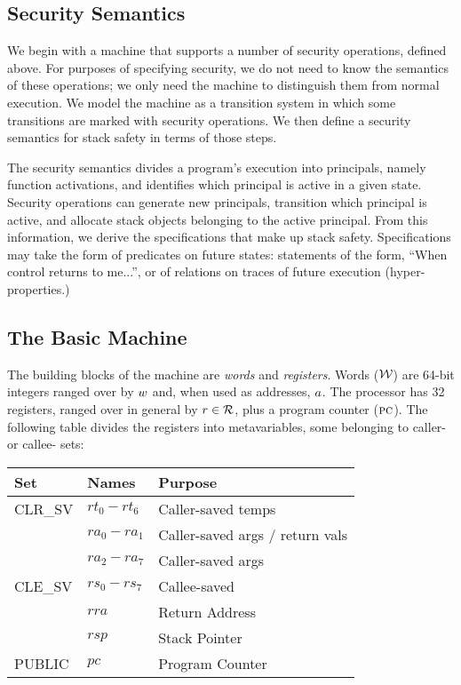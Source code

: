 \documentclass[10pt,conference]{ieeetran}%
\theoremstyle{definition}
\begin{document}
\subsection{Security Semantics}

We begin with a machine that supports a number of security operations,
defined above. For purposes of specifying security, we do not need to
know the semantics of these operations; we only need the machine to
distinguish them from normal execution. We model the machine as
a transition system in which some transitions are marked with
security operations. We then define a security semantics for stack safety
in terms of those steps.

The security semantics divides a program's execution into principals,
namely function activations, and identifies which principal is active
in a given state. Security operations can generate new principals, transition
which principal is active, and allocate stack objects belonging to the active
principal. From this information, we derive the specifications that make up
stack safety. Specifications may take the form of predicates on
future states: statements of the form, ``When control returns to me...'',
or of relations on traces of future execution (hyper-properties.)

\subsection{The Basic Machine}

The building blocks of the machine are {\em words} and {\em registers}.
Words (\({\mathcal W}\)) are 64-bit integers ranged over by \(w\) and, when used as addresses,
\(a\). The processor has 32 registers, ranged over in general by \(r \in {\mathcal R}\),
plus a program counter (\(\textsc{pc}\)). The following table divides
the registers into metavariables, some belonging to caller- or callee- sets:

\vspace{\abovedisplayskip}
\begin{tabular}{| l | l | l |}
  \hline
  Set & Names & Purpose \\
  \hline
  CLR\_SV & \(rt_0 - rt_6\) & Caller-saved temps \\
  & \(ra_0 - ra_1\) & Caller-saved args / return vals \\
  & \(ra_2 - ra_7\) & Caller-saved args \\
  \hline
  CLE\_SV & \(rs_0 - rs_7\) & Callee-saved \\
  & \(rra\) & Return Address \\
  & \(rsp\) & Stack Pointer \\  
  \hline
  PUBLIC & \(pc\) & Program Counter \\
  \hline
\end{tabular}
\vspace{\abovedisplayskip}
\end{document}
